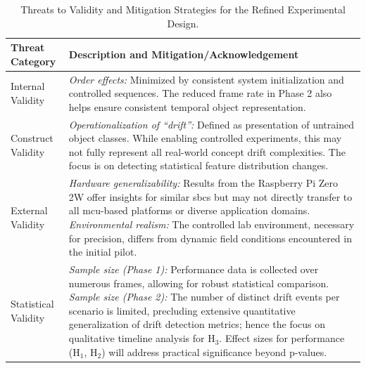 \begin{table}[htbp]
    \caption[Threats to Validity and Mitigation Strategies for the Refined Experiment]{Threats to Validity and Mitigation Strategies for the Refined Experimental Design.}
    \label{tab:threats_to_validity}
    \begin{tabularx}{\linewidth}{@{}lX@{}}
        \toprule
        \textbf{Threat Category} & \textbf{Description and Mitigation/Acknowledgement} \\
        \midrule
        Internal Validity & 
        \textit{Order effects:} Minimized by consistent system initialization and controlled sequences. The reduced frame rate in Phase 2 also helps ensure consistent temporal object representation. \\
        \addlinespace
        Construct Validity & 
        \textit{Operationalization of ``drift'':} Defined as presentation of untrained object classes. While enabling controlled experiments, this may not fully represent all real-world concept drift complexities. The focus is on detecting statistical feature distribution changes. \\
        \addlinespace
        External Validity & 
        \textit{Hardware generalizability:} Results from the Raspberry Pi Zero 2W offer insights for similar \gls{sbc}s but may not directly transfer to all \gls{mcu}-based platforms or diverse application domains. \newline
        \textit{Environmental realism:} The controlled lab environment, necessary for precision, differs from dynamic field conditions encountered in the initial pilot. \\
        \addlinespace
        Statistical Validity & 
        \textit{Sample size (Phase 1):} Performance data is collected over numerous frames, allowing for robust statistical comparison. \newline
        \textit{Sample size (Phase 2):} The number of distinct drift events per scenario is limited, precluding extensive quantitative generalization of drift detection metrics; hence the focus on qualitative timeline analysis for H$_3$. Effect sizes for performance (H$_1$, H$_2$) will address practical significance beyond p-values. \\
        \bottomrule
    \end{tabularx}
\end{table}

